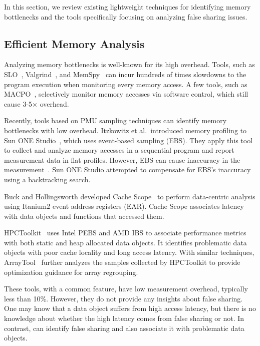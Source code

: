 \label{sec:relatedwork}
In this section, we review existing lightweight techniques for identifying memory bottlenecks and the tools specifically focusing on analyzing false sharing issues.

\subsection{Efficient Memory Analysis}
Analyzing memory bottlenecks is well-known for its high overhead. Tools, such as SLO~\cite{SLO1}, Valgrind~\cite{Nethercote:2007:VFH:1250734.1250746}, and MemSpy~\cite{Martonosi92} can incur hundreds of times slowdowns to the program execution when monitoring every memory access. A few tools, such as MACPO~\cite{macpo}, selectively monitor memory accesses via software control, which still cause 3-5$\times$ overhead.

Recently, tools based on PMU sampling techniques can identify memory bottlenecks with low overhead. 
Itzkowitz et al.\ introduced memory profiling to Sun ONE Studio~\cite{DBLP:conf/sc/ItzkowitzWAK03}, which uses event-based sampling (EBS). 
They apply this tool to collect and analyze memory accesses in a sequential program and report measurement data in flat profiles. However, EBS can cause inaccuracy in the measurement~\cite{AMDIBS:07}.
Sun ONE Studio attempted to compensate for EBS's inaccuracy using a backtracking search.

Buck and Hollingsworth developed Cache Scope~\cite{DBLP:conf/sc/BuckH04} to perform data-centric analysis using 
Itanium2 event address registers (EAR).
Cache Scope associates latency with data objects and functions that accessed them.

HPCToolkit~\cite{ibs-sc} uses Intel PEBS and AMD IBS to associate performance metrics with both static and heap allocated data objects. It identifies problematic data objects with poor cache locality and long access latency. With similar techniques, ArrayTool~\cite{ibs-pact} further analyzes the samples collected by HPCToolkit to provide optimization guidance for array regrouping.


These tools, with a common feature, have low measurement overhead, typically less than 10\%. However, they do not provide any insights about false sharing. One may know that a data object suffers from high access latency, but there is no knowledge about whether the high latency comes from false sharing or not. In contrast, \cheetah{} can identify false sharing and also associate it with problematic data objects.


